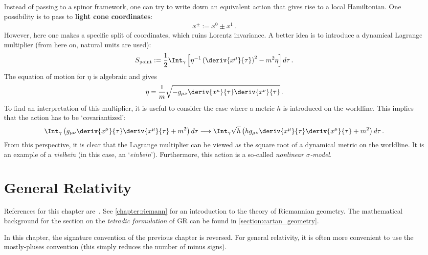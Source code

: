     Instead of passing to a spinor framework, one can try to write down an equivalent action that gives rise to a local Hamiltonian. One possibility is to pass to \textbf{light cone coordinates}:
    \begin{gather}
        x^\pm := x^0\pm x^1\,.
    \end{gather}
    However, here one makes a specific split of coordinates, which ruins Lorentz invariance. A better idea is to introduce a dynamical Lagrange multiplier (from here on, natural units are used):
    \begin{gather}
        S_{\text{point}} := \frac{1}{2}\Int_\gamma\left[\eta^{-1}\left(\deriv{x^\mu}{\tau}\right)^2-m^2\eta\right]d\tau\,.
    \end{gather}
    The equation of motion for $\eta$ is algebraic and gives
    \begin{gather}
        \eta = \frac{1}{m}\sqrt{-g_{\mu\nu}\deriv{x^\mu}{\tau}\deriv{x^\nu}{\tau}}\,.
    \end{gather}
    To find an interpretation of this multiplier, it is useful to consider the case where a metric $h$ is introduced on the worldline. This implies that the action has to be `covariantized':
    \begin{gather}
        \Int_\gamma\left(g_{\mu\nu}\deriv{x^\mu}{\tau}\deriv{x^\mu}{\tau}+m^2\right)d\tau\longrightarrow\Int_\gamma\sqrt{h}\left(hg_{\mu\nu}\deriv{x^\mu}{\tau}\deriv{x^\mu}{\tau}+m^2\right)d\tau\,.
    \end{gather}
    From this perspective, it is clear that the Lagrange multiplier can be viewed as the square root of a dynamical metric on the worldline. It is an example of a \textit{vielbein} (in this case, an `\textit{einbein}'). Furthermore, this action is a so-called \textit{nonlinear $\sigma$-model}.


\chapter{General Relativity}\label{chapter:GR}

    References for this chapter are~\citet{rovelli_covariant_2014,misner_gravitation_2017}. See \cref{chapter:riemann} for an introduction to the theory of Riemannian geometry. The mathematical background for the section on the \textit{tetradic formulation} of GR can be found in \cref{section:cartan_geometry}.

    In this chapter, the signature convention of the previous chapter is reversed. For general relativity, it is often more convenient to use the mostly-pluses convention (this simply reduces the number of minus signs).

